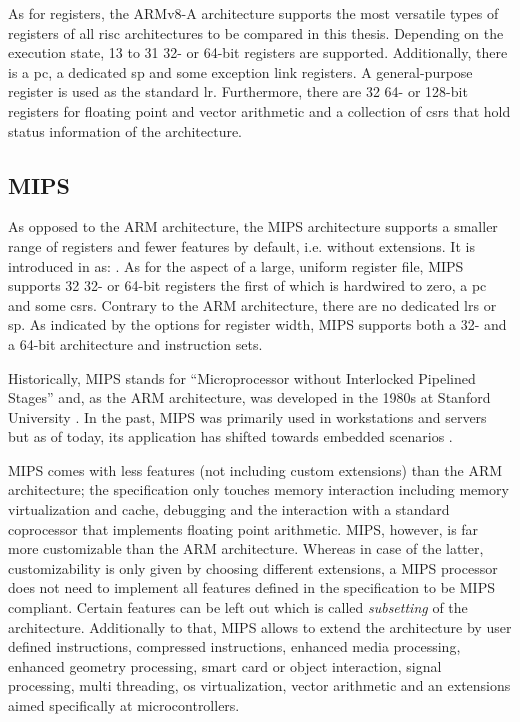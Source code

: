 As for registers, the ARMv8-A architecture supports the most versatile types of registers of all \gls{risc} architectures to be compared in this thesis.
Depending on the execution state, 13 to 31 32- or 64-bit registers are supported.
Additionally, there is a \gls{pc}, a dedicated \gls{sp} and some exception link registers.
A general-purpose register is used as the standard \gls{lr}.
Furthermore, there are 32 64- or 128-bit registers for floating point and vector arithmetic and a collection of \glspl{csr} that hold status information of the architecture.

\subsection{MIPS}

As opposed to the ARM architecture, the MIPS architecture supports a smaller range of registers and fewer features by default, i.e. without extensions.
It is introduced in  \cite{MIPS} as: .
As for the aspect of a large, uniform register file, MIPS supports 32 32- or 64-bit registers the first of which is hardwired to zero, a \gls{pc} and some \glspl{csr}.
Contrary to the ARM architecture, there are no dedicated \glspl{lr} or \gls{sp}.
As indicated by the options for register width, MIPS supports both a 32- and a 64-bit architecture and instruction sets.

Historically, MIPS stands for \enquote{Microprocessor without Interlocked Pipelined Stages} and, as the ARM architecture, was developed in the 1980s at Stanford University \cite[p.4.16-4]{Patterson13}.
In the past, MIPS was primarily used in workstations and servers but as of today, its application has shifted towards embedded scenarios \cite{MIPS}.

MIPS comes with less features (not including custom extensions) than the ARM architecture; the specification only touches memory interaction including memory virtualization and cache, debugging and the interaction with a standard coprocessor that implements floating point arithmetic.
MIPS, however, is far more customizable than the ARM architecture.
Whereas in case of the latter, customizability is only given by choosing different extensions, a MIPS processor does not need to implement all features defined in the specification to be MIPS compliant.
Certain features can be left out which is called \textit{subsetting} of the architecture.
Additionally to that, MIPS allows to extend the architecture by user defined instructions, compressed instructions, enhanced media processing, enhanced geometry processing, smart card or object interaction, signal processing, multi threading, \gls{os} virtualization, vector arithmetic and an extensions aimed specifically at microcontrollers.

